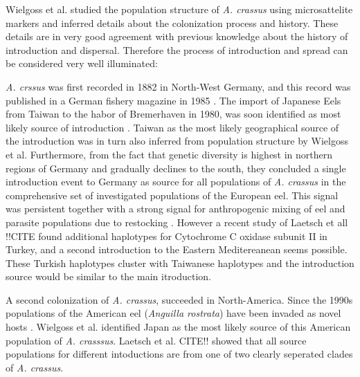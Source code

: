 Wielgoss et al. \cite{wielgoss_population_2008} studied the population
structure of \textit{A. crassus} using microsattelite markers and
inferred details about the colonization process and history. These
details are in very good agreement with previous knowledge about the
history of introduction and dispersal. Therefore the process of
introduction and spread can be considered very well illuminated:

\textit{A. crssus} was first recorded in 1882 in North-West Germany,
and this record was published in a German fishery magazine in 1985
\cite{fischer_teichwirt}. The import of Japanese Eels from Taiwan to
the habor of Bremerhaven in 1980, was soon identified as most likely
source of introduction
\cite{koops_anguillicola-infestations_1989}. Taiwan as the most likely
geographical source of the introduction was in turn also inferred from
population structure by Wielgoss et al. Furthermore, from the fact
that genetic diversity is highest in northern regions of Germany and
gradually declines to the south, they concluded a single introduction
event to Germany as source for all populations of \textit{A. crassus}
in the comprehensive set of investigated populations of the European
eel. This signal was persistent together with a strong signal for
anthropogenic mixing of eel and parasite populations due to restocking
\cite{pmid20646147}. However a recent study of Laetsch et all !!CITE
found additional haplotypes for Cytochrome C oxidase subunit II in
Turkey, and a second introduction to the Eastern Meditereanean seems
possible. These Turkish haplotypes cluster with Taiwanese haplotypes
and the introduction source would be similar to the main itroduction.


A second colonization of \textit{A. crassus}, succeeded in
North-America. Since the 1990s populations of the American eel
(\textit{Anguilla rostrata}) have been invaded as novel hosts
\cite{fries_notes:_1996,barse_exotic_1999,
  barse_swimbladder_2001}. Wielgoss et al. identified Japan as the
most likely source of this American population of
\textit{A. crasssus}. Laetsch et al. CITE!! showed that all source
populations for different intoductions are from one of two clearly
seperated clades of \textit{A. crassus}.

